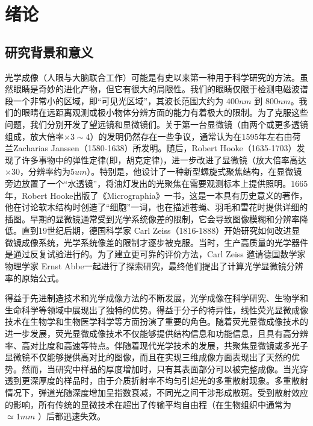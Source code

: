 
\chapter{绪论}\label{chap:1}
\section{研究背景和意义}
光学成像（人眼与大脑联合工作）可能是有史以来第一种用于科学研究的方法。虽然眼睛是奇妙的进化产物，但它有很大的局限性。我们的眼睛仅限于检测电磁波谱段一个非常小的区域，即“可见光区域”，其波长范围大约为 $400 nm$ 到 $800 nm$。我们的眼睛在远距离观测或极小物体分辨方面的能力有着极大的限制。为了克服这些问题，我们分别开发了望远镜和显微镜们。关于第一台显微镜（由两个或更多透镜组成，放大倍率$ \times 3 \sim 4$）的发明仍然存在一些争议，通常认为在1595年左右由荷兰Zacharias Janssen（1580-1638）所发明。随后，Robert Hooke（1635-1703）发现了许多事物中的弹性定律(即，胡克定律)，进一步改进了显微镜（放大倍率高达 $ \times 30$，分辨率约为$5 um$）。特别是，他设计了一种新型螺旋式聚焦结构，在显微镜旁边放置了一个“水透镜”，将油灯发出的光聚焦在需要观测标本上提供照明。1665年，Robert Hooke出版了《Micrographia》\cite{robert_micrographia_2015}一书，这是一本具有历史意义的著作，他在讨论软木结构时创造了“细胞”一词，也在描述苍蝇、羽毛和雪花时提供详细的插图。早期的显微镜通常受到光学系统像差的限制，它会导致图像模糊和分辨率降低。直到19世纪后期，德国科学家 Carl Zeiss（1816-1888）开始研究如何改进显微镜成像系统，光学系统像差的限制才逐步被克服。当时，生产高质量的光学器件是通过反复试验进行的。为了建立更可靠的评价方法，Carl Zeiss 邀请德国数学家物理学家 Ernst Abbe一起进行了探索研究，最终他们提出了计算光学显微镜分辨率的原始公式\cite{abbe_beitrage_1873}。

得益于先进制造技术和光学成像方法的不断发展，光学成像在科学研究、生物学和生命科学等领域中展现出了独特的优势。得益于分子的特异性，线性荧光显微成像技术在生物学和生物医学科学等方面扮演了重要的角色。随着荧光显微成像技术的进一步发展，荧光显微成像技术不仅能够提供结构信息和功能信息\cite{Lichtman2005}，且具有高分辨率、高对比度和高速等特点。伴随着现代光学技术的发展，共聚焦显微镜或多光子显微镜不仅能够提供高对比的图像，而且在实现三维成像方面表现出了天然的优势。然而，当研究中样品的厚度增加时，只有其表面部分可以被完整成像。当光穿透到更深厚度的样品时，由于介质折射率不均匀引起光的多重散射现象。多重散射情况下，弹道光随深度增加呈指数衰减，不同光之间干涉形成散斑\cite{Goodman1976}。受到散射效应的影响，所有传统的显微技术在超出了传输平均自由程（在生物组织中通常为 $\simeq 1 mm$ \cite{ntziachristos_going_2010}）后都迅速失效。

